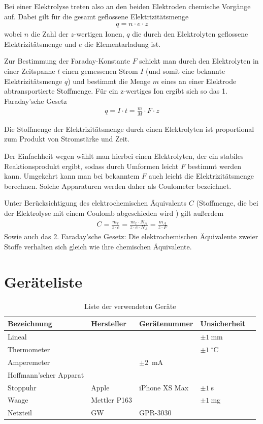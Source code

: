 \documentclass{article}
\begin{document}
Bei einer Elektrolyse treten also an den beiden Elektroden chemische Vorgänge auf. Dabei gilt für die gesamt geflossene Elektrizitätsmenge
\begin{align}
q = n\cdot e \cdot z
\end{align}
wobei $n$ die Zahl der $z$-wertigen Ionen, $q$ die durch den Elektrolyten geflossene Elektrizitätsmenge und $e$ die Elementarladung ist.

Zur Bestimmung der Faraday-Konstante $F$ schickt man durch den Elektrolyten in einer Zeitspanne $t$ einen gemessenen Strom $I$ (und somit eine bekannte Elektrizitätsmenge $q$) und bestimmt die Menge $m$ eines an einer Elektrode abtransportierte Stoffmenge. Für ein z-wertiges Ion ergibt sich so das 1. Faraday'sche Gesetz
\begin{align}
q = I\cdot t = \frac{m}{M} \cdot F \cdot z
\end{align}



Die Stoffmenge der Elektrizitätsmenge durch einen Elektrolyten ist proportional zum Produkt von Stromstärke und Zeit.

Der Einfachheit wegen wählt man hierbei einen Elektrolyten, der ein stabiles Reaktionsprodukt ergibt, sodass durch Umformen leicht $F$ bestimmt werden kann. Umgekehrt kann man bei bekanntem $F$ auch leicht die Elektrizitätsmenge berechnen. Solche Apparaturen werden daher als Coulometer bezeichnet.

Unter Berücksichtigung des elektrochemischen Äquivalents $C$ (Stoffmenge, die bei der Elektrolyse mit einem Coulomb abgeschieden wird \cite{chemie}) gilt außerdem
\begin{align}
C = \frac{m_x}{z\cdot e} = \frac{m_x\cdot N_A}{z\cdot e \cdot N_A} = \frac{m_A}{z\cdot F}
\end{align}
Sowie auch das 2. Faraday'sche Gesetz: Die elektrochemischen Äquivalente zweier Stoffe verhalten sich gleich wie ihre chemischen Äquivalente.





\section{Geräteliste}

\begin{table}[H]
\caption{Liste der verwendeten Geräte}

\begin{tabular}{l|llll}
Bezeichnung & Hersteller & Gerätenummer & Unsicherheit \\
\hline
Lineal & & & $\pm 1~$mm \\
Thermometer & & & $\pm 1~^\circ$C \\
Amperemeter & & $\pm 2$~mA \\
Hoffmann'scher Apparat  & & \\
Stoppuhr & Apple & iPhone XS Max & $\pm 1~$s \\
Waage & Mettler P163 &  & $\pm 1~$mg \\
Netzteil & GW & GPR-3030 & 
\end{tabular}

\end{table}
\end{document}
